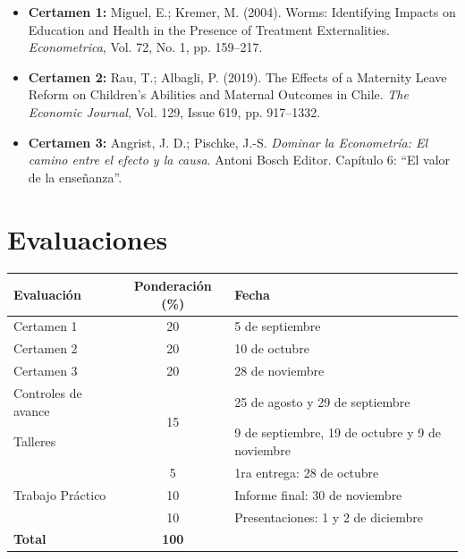 \documentclass[10pt,a4paper]{article}
\begin{document}
\begin{itemize}
    \item \textbf{Certamen 1:} Miguel, E.; Kremer, M. (2004). Worms: Identifying Impacts on Education and Health in the Presence of Treatment Externalities. \textit{Econometrica}, Vol. 72, No. 1, pp. 159–217.
    \item \textbf{Certamen 2:} Rau, T.; Albagli, P. (2019). The Effects of a Maternity Leave Reform on Children's Abilities and Maternal Outcomes in Chile. \textit{The Economic Journal}, Vol. 129, Issue 619, pp. 917–1332.
    \item \textbf{Certamen 3:} Angrist, J. D.; Pischke, J.-S. \textit{Dominar la Econometría: El camino entre el efecto y la causa}. Antoni Bosch Editor. Capítulo 6: ``El valor de la enseñanza''.
\end{itemize}


\section{Evaluaciones} 

\begin{table}[h!]
\centering
\label{tab:evaluaciones}
\begin{tabular}{@{} l c p{6cm} @{}}
\toprule
\textbf{Evaluación} & \textbf{Ponderación (\%)} & \textbf{Fecha} \\
\midrule
Certamen 1           & 20 & 5 de septiembre \\
Certamen 2           & 20 & 10 de octubre \\
Certamen 3           & 20 & 28 de noviembre \\
\midrule
Controles de avance  & \multirow{2}{*}{15} & 25 de agosto y 29 de septiembre \\
Talleres             &                     & 9 de septiembre, 19 de octubre y 9 de noviembre \\
\midrule
\multirow{3}{4em}{Trabajo Práctico} & 5  & 1ra entrega: 28 de octubre \\
                                    & 10 & Informe final: 30 de noviembre \\
                                    & 10 & Presentaciones:  1 y 2 de diciembre \\
\midrule
\textbf{Total}       & \textbf{100} & \\
\bottomrule
\end{tabular}
\end{table}
\end{document}
